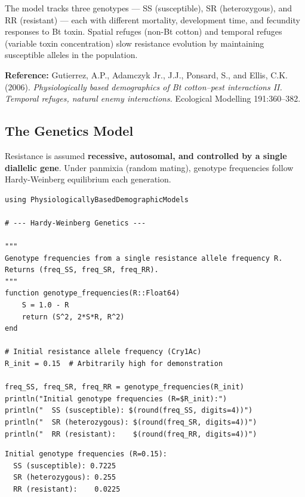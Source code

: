 The model tracks three genotypes — SS (susceptible), SR (heterozygous), and RR (resistant) — each with different mortality, development time, and fecundity responses to Bt toxin. Spatial refuges (non-Bt cotton) and temporal refuges (variable toxin concentration) slow resistance evolution by maintaining susceptible alleles in the population.



\textbf{Reference:} Gutierrez, A.P., Adamczyk Jr., J.J., Ponsard, S., and Ellis, C.K. (2006). \emph{Physiologically based demographics of Bt cotton–pest interactions II. Temporal refuges, natural enemy interactions.} Ecological Modelling 191:360–382.



\subsection{The Genetics Model}



\label{3462415797690649149}{}


Resistance is assumed \textbf{recessive, autosomal, and controlled by a single diallelic gene}. Under panmixia (random mating), genotype frequencies follow Hardy-Weinberg equilibrium each generation.




\begin{verbatim}
using PhysiologicallyBasedDemographicModels

# --- Hardy-Weinberg Genetics ---

"""
Genotype frequencies from a single resistance allele frequency R.
Returns (freq_SS, freq_SR, freq_RR).
"""
function genotype_frequencies(R::Float64)
    S = 1.0 - R
    return (S^2, 2*S*R, R^2)
end

# Initial resistance allele frequency (Cry1Ac)
R_init = 0.15  # Arbitrarily high for demonstration

freq_SS, freq_SR, freq_RR = genotype_frequencies(R_init)
println("Initial genotype frequencies (R=$R_init):")
println("  SS (susceptible): $(round(freq_SS, digits=4))")
println("  SR (heterozygous): $(round(freq_SR, digits=4))")
println("  RR (resistant):    $(round(freq_RR, digits=4))")
\end{verbatim}




\begin{verbatim}
Initial genotype frequencies (R=0.15):
  SS (susceptible): 0.7225
  SR (heterozygous): 0.255
  RR (resistant):    0.0225
\end{verbatim}



